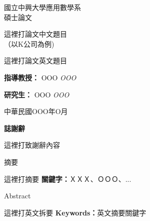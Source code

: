 \documentclass{ctexart}
\begin{document}
\begin{titlepage}
    \centering
    {\fontsize{20}{24}\selectfont 國立中興大學應用數學系\\[0.5cm] 碩士論文 \par}
    \vspace{4.8cm} %
    {\fontsize{20}{24}\selectfont 這裡打論文中文題目\\（以K公司為例)\par}
    {\fontsize{20}{24}\selectfont 這裡打論文英文題目\par}
     \vspace{6.2cm}
    {\fontsize{20}{24}\selectfont \textbf{指導教授：}\setmainfont{Kaiti TC} OOO \textit{OOO} \par}  
     \vspace{0.5cm} %
    {\fontsize{20}{24}\selectfont \textbf{研究生：}\setmainfont{Kaiti TC} OOO \textit{OOO} \par}
    \vfill
    {\fontsize{20}{24}\selectfont 中華民國OOO年O月 \par}
\end{titlepage}

\onehalfspacing %

\clearpage
\thispagestyle{empty} %
\begin{center}
    \Large \textbf{誌謝辭}
\end{center}
\vspace{0.5cm}
\noindent
\par
這裡打致謝辭內容
\newpage

\begin{center}
{\fontsize{20}{24}\selectfont 摘要} %
\setcounter{page}{1} %
\end{center}
\vspace{0.5cm} %
\noindent %
\par
這裡打摘要
\vspace{1cm} %
\noindent %
\textbf{關鍵字：}ＸＸＸ、ＯＯＯ、...
\thispagestyle{plain} %
\newpage

\begin{center}
    {\fontsize{20}{24}\selectfont Abstract} %
\end{center}
\vspace{0.5cm} %
\noindent %
\par
這裡打英文拆要
\vspace{1cm} %
\noindent %
\textbf{Keywords：}英文摘要關鍵字
\thispagestyle{plain} %
\newpage
\end{document}
